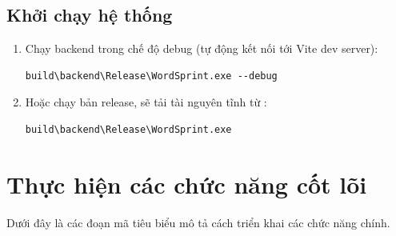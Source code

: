 \subsection{Khởi chạy hệ thống}
\label{subsec:run}
\begin{enumerate}
    \item Chạy backend trong chế độ debug (tự động kết nối tới Vite dev server):
    \begin{lstlisting}[caption={Chạy ứng dụng trong debug}, label={lst:run_debug}]
build\backend\Release\WordSprint.exe --debug
\end{lstlisting}
    \item Hoặc chạy bản release, sẽ tải tài nguyên tĩnh từ :
    \begin{lstlisting}[caption={Chạy bản release}, label={lst:run_release}]
build\backend\Release\WordSprint.exe
\end{lstlisting}
\end{enumerate}

\section{Thực hiện các chức năng cốt lõi}
\label{sec:core_features}
Dưới đây là các đoạn mã tiêu biểu mô tả cách triển khai các chức năng chính.

